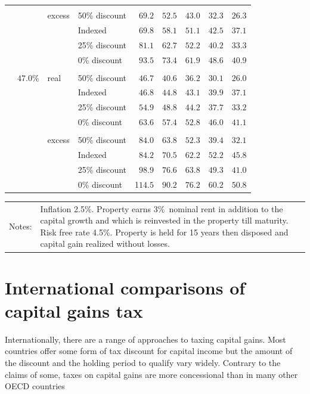 \begin{subappendices}
\begin{table}
{\begin{tabular}{Qlllrrrrr}
   &\phantom{.}\\[-9pt] &  & excess & 50\% discount & $69.2$ & $52.5$ & $43.0$ & $32.3$ & $26.3$ \\ 
   &  &  & Indexed & $69.8$ & $58.1$ & $51.1$ & $42.5$ & $37.1$ \\ 
   &  &  & 25\% discount & $81.1$ & $62.7$ & $52.2$ & $40.2$ & $33.3$ \\ 
   &  &  & 0\% discount & $93.5$ & $73.4$ & $61.9$ & $48.6$ & $40.9$ \\ 
   &\phantom{.}\\[-6pt]
   & $47.0$\% & real & 50\% discount & $46.7$ & $40.6$ & $36.2$ & $30.1$ & $26.0$ \\ 
   &  &  & Indexed & $46.8$ & $44.8$ & $43.1$ & $39.9$ & $37.1$ \\ 
   &  &  & 25\% discount & $54.9$ & $48.8$ & $44.2$ & $37.7$ & $33.2$ \\ 
   &  &  & 0\% discount & $63.6$ & $57.4$ & $52.8$ & $46.0$ & $41.1$ \\ 
   &\phantom{.}\\[-9pt]
   &  & excess & 50\% discount & $84.0$ & $63.8$ & $52.3$ & $39.4$ & $32.1$ \\ 
   &  &  & Indexed & $84.2$ & $70.5$ & $62.2$ & $52.2$ & $45.8$ \\ 
   &  &  & 25\% discount & $98.9$ & $76.6$ & $63.8$ & $49.3$ & $41.0$ \\ 
   &  &  & 0\% discount & 1$14.5$ & $90.2$ & $76.2$ & $60.2$ & $50.8$ \\ 
   \bottomrule
\end{tabular}}

\begin{tabular}{l@{}p{}}
{\footnotesize Notes:\hspace{1em}} & {\footnotesize Inflation 2.5\%. Property earns 3\%\ nominal rent in addition to the capital growth and which is reinvested in the property till maturity. Risk free rate 4.5\%. Property is held for 15 years then disposed and capital gain realized without losses.}
\end{tabular}
\end{table}
\renewcommand{\arraystretch}{1.0}
\normalsize


\chapter{International comparisons of capital gains tax}\label{appendix:Intl-comparisons-of-CGT}
Internationally, there are a range of approaches to taxing capital gains. Most countries offer some form of tax discount for capital income but the amount of the discount and the holding period to qualify vary widely. Contrary to the claims of some, taxes on capital gains are more concessional than in many other OECD countries 


\end{subappendices}
